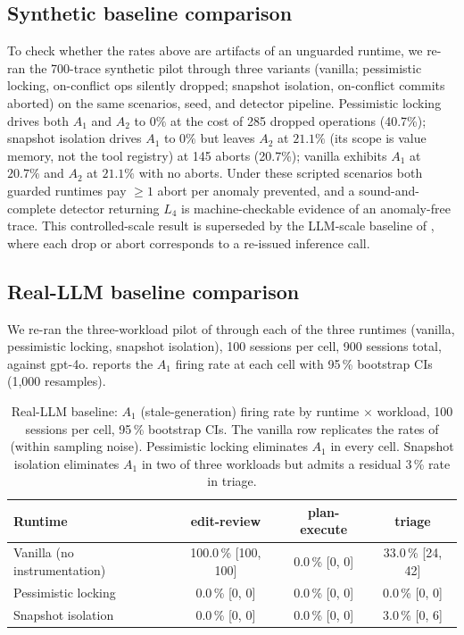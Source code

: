 \documentclass[journal,compsoc,10pt]{IEEEtran}
\theoremstyle{definition}
\theoremstyle{remark}
\begin{document}
\subsection{Synthetic baseline comparison}
\label{sec:synth-baseline}
To check whether the rates above are artifacts of an unguarded runtime, we
re-ran the 700-trace synthetic pilot through three variants (vanilla;
pessimistic locking, on-conflict ops silently dropped; snapshot isolation,
on-conflict commits aborted) on the same scenarios, seed, and detector
pipeline. Pessimistic locking drives both $A_1$ and $A_2$ to $0\%$ at the
cost of 285 dropped operations (40.7\%); snapshot isolation drives $A_1$ to
$0\%$ but leaves $A_2$ at $21.1\%$ (its scope is value memory, not the tool
registry) at 145 aborts (20.7\%); vanilla exhibits $A_1$ at $20.7\%$ and
$A_2$ at $21.1\%$ with no aborts. Under these scripted scenarios both
guarded runtimes pay $\geq 1$ abort per anomaly prevented, and a
sound-and-complete detector returning $L_4$ is machine-checkable evidence
of an anomaly-free trace. This controlled-scale result is superseded by the
LLM-scale baseline of , where each drop or
abort corresponds to a re-issued inference call.
\subsection{Real-LLM baseline comparison}
\label{sec:real-llm-baseline}
We re-ran the three-workload pilot of 
through each of the three runtimes (vanilla, pessimistic locking,
snapshot isolation), 100 sessions per cell, 900 sessions total,
against gpt-4o.  reports the $A_1$
firing rate at each cell with 95\,\% bootstrap CIs (1{,}000
resamples).

\begin{table}[t]
\centering
\caption{Real-LLM baseline: $A_1$ (stale-generation) firing rate
by runtime $\times$ workload, 100 sessions per cell, 95\,\%
bootstrap CIs. The vanilla row replicates the rates of
 (within sampling noise). Pessimistic
locking eliminates $A_1$ in every cell. Snapshot isolation
eliminates $A_1$ in two of three workloads but admits a residual
3\,\% rate in triage.}
\label{tab:real-llm-baseline}
\label{sec:si-triage-gap}
\small
\begin{tabular}{lccc}
\toprule
Runtime & edit-review & plan-execute & triage \\
\midrule
Vanilla (no instrumentation) & 100.0\,\% [100, 100] & 0.0\,\% [0, 0] & 33.0\,\% [24, 42] \\
Pessimistic locking & 0.0\,\% [0, 0] & 0.0\,\% [0, 0] & 0.0\,\% [0, 0] \\
Snapshot isolation & 0.0\,\% [0, 0] & 0.0\,\% [0, 0] & 3.0\,\% [0, 6] \\
\bottomrule
\end{tabular}
\end{table}
\end{document}
